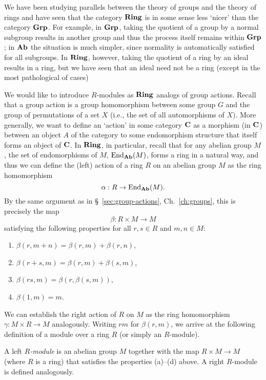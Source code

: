 We have been studying parallels between the theory of groups and the theory of
rings and have seen that the category \(\mathbf{Ring}\) is in some sense less `nicer'
than the category \(\mathbf{Grp}\). For example, in \(\mathbf{Grp}\), taking the quotient of a
group by a normal subgroup results in another group and thus the process itself
remains within \(\mathbf{Grp}\); in \(\mathbf{Ab}\) the situation is much simpler, since
normality is automatically satisfied for all subgroups. In \(\mathbf{Ring}\), however,
taking the quotient of a ring by an ideal results in a ring, but we have seen
that an ideal need not be a ring (except in the most pathological of cases)



We would like to introduce \(R\)-modules as \(\mathbf{Ring}\) analogs of group actions.
Recall that a group action is a group homomorphism between some group \(G\) and
the group of permutations of a set \(X\) (i.e., the set of all automorphisms of
\(X\)). More generally, we want to define an `action' in some category
\(\mathbf{C}\) as a morphism (in \(\mathbf{C}\)) between an object \(A\) of the
category to some endomorphism structure that itself forms an object of
\(\mathbf{C}\). In \(\mathbf{Ring}\), in particular, recall that for any abelian group
\(M\), the set of endomorphisms of \(M\), \(\operatorname{End}_{\mathbf{Ab}}(M)\), forms a ring in a
natural way, and thus we can define the (left) action of a ring \(R\) on an
abelian group \(M\) as the ring homomorphism
\[
    \alpha : R \to \operatorname{End}_{\mathbf{Ab}}(M).
\]
By the same argument as in \S~\ref{sec:group-actions}, Ch.~\ref{ch:groups}, this
is precisely the map
\[
    \beta : R \times M \to M
\]
satisfying the following properties for all \(r, s \in R\) and \(m, n \in M\):
\begin{enumerate}[label=(\alph*)]
    \item \(\beta(r, m + n) = \beta(r, m) + \beta(r, n)\),
    \item \(\beta(r + s, m) = \beta(r, m) + \beta(s, m)\),
    \item \(\beta(rs, m) = \beta(r, \beta(s, m))\),
    \item \(\beta(1, m) = m\).
\end{enumerate}
We can establish the right action of \(R\) on \(M\) as the ring homomorphism
\(\gamma : M \times R \to M\) analogously. Writing \(rm\) for \(\beta(r, m)\),
we arrive at the following definition of a module over a ring \(R\) (or simply an
\(R\)-module).

\begin{definition}
    A left \emph{\(R\)-module} is an abelian group \(M\) together with the map \(R \times M \to M\) (where \(R\) is a ring) that satisfies the properties (a)--(d) above. A right \(R\)-module is defined analogously.
\end{definition}

